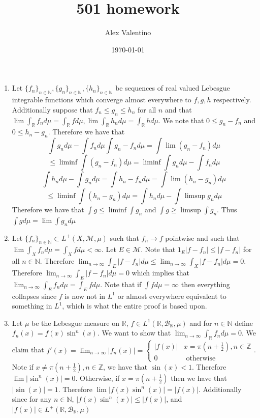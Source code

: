 \documentclass[12pt, letterpaper]{article}
\date{\today}
\author{Alex Valentino}
\title{501 homework}
\newcommand{\Z}{\mathbb{Z}}
\newcommand{\N}{\mathbb{N}}
\newcommand{\R}{\mathbb{R}}
\begin{document}
\begin{enumerate}
	\item Let $\{f_n\}_{n \in \N},\{g_n\}_{n \in \N},\{h_n\}_{n \in \N}$ be sequences of real valued Lebesgue 
	integrable functions which converge almost everywhere to $f,g,h$ respectively.  Additionally suppose that 
	$f_n \leq g_n \leq h_n$ for all $n$ and that 
	$\lim \int_\R f_n d \mu = \int_\R f d \mu,\lim \int_\R h_n d \mu = \int_\R h d \mu$.  We note that 
	$0 \leq g_n - f_n$ and $0 \leq h_n - g_n$.  Therefore we have that
	$$
		\int g_nd \mu - \int f_n d \mu\int g_n - f_n d \mu= \int \lim(g_n - f_n)d \mu 
$$
$$		
		\leq \liminf \int (g_n - f_n)d \mu = \liminf \int g_nd \mu - 
		\int f_nd \mu	
	$$
	$$
		\int h_nd \mu - \int g_nd \mu = \int h_n - f_n d \mu= \int \lim (h_n - g_n)d \mu 
		$$
		$$
		\leq \liminf \int (h_n - g_n)d \mu = \int h_nd \mu -\int \limsup g_nd \mu
	$$
	Therefore we have that $\int g \leq \liminf \int g_n$ and $\int g \geq \limsup \int g_n$.  Thus 
	$\int g d \mu= \lim \int g_n d \mu$
	\item Let $\{f_n\}_{n \in \N} \subset L^+(X,\mathcal{M},\mu)$ such that 
	$f_n \to f$ pointwise and such that $\lim \int_X f_n d\mu = \int_X fd\mu < \infty$.  
	Let $E \in \mathcal{M}$.  Note that $1_E |f - f_n| \leq |f - f_n|$ for all $n \in \N$.  Therefore
	$\lim_{n \to \infty} \int_E |f - f_n| d \mu \leq \lim_{n \to \infty} \int_X |f - f_n| d \mu = 0$.  Therefore 
	$ \lim_{n \to \infty} \int_E |f - f_n| d \mu  = 0$ which implies that
	$\lim_{n \to \infty} \int_E f_n d \mu = \int_E f d \mu$.  Note that if
	$\int f d \mu = \infty$ then everything collapses since $f$ is now not in $L^1$ or almost everywhere equivalent to something in $L^1$, which is what the entire proof
	is based upon.  
	\item Let $\mu$ be the Lebesgue measure on $\R$, $f \in L^1(\R, \mathcal{B}_\R,\mu)$
	and for $n \in \N$ define $f_n(x) = f(x) \sin^n(x)$.  We want to show that 
	$\lim_{n\to \infty} \int_\R f_n d\mu = 0$.  We claim that 
	$f'(x) = \lim_{n \to \infty }|f_n(x)| = \begin{cases} |f(x)| & x = \pi (n + \frac{1}{2}), n \in \Z\\
	0 & \text{ otherwise}
	\end{cases}$.  Note if $x \neq \pi (n + \frac{1}{2}), n \in \Z$, we have that
	$\sin(x) < 1$.  Therefore $\lim |\sin^n(x)| = 0$.  Otherwise, if 
	$x = \pi (n + \frac{1}{2})$ then we have that $|\sin(x)| = 1$.  Therefore 
	$\lim |f(x) \sin^n(x)| = |f(x)|$.  Additionally since for any $n \in \N$, 
	$|f(x)\sin^n(x)| \leq |f(x)|$, and $|f(x)| \in L^+(\R, \mathcal{B}_\R,\mu)$ 

\end{enumerate}
\end{document}
